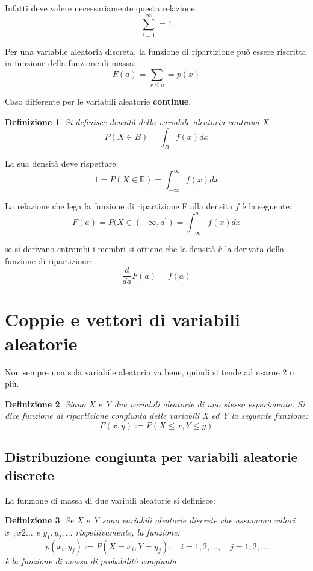 \documentclass[12pt]{article}
\newtheorem{definition}{Definizione}[section]
\begin{document}
Infatti deve valere necessariamente questa relazione: 
\[
\sum_{i=1}^{\infty} = 1    
\]
\newpage

Per una variabile aleatoria discreta, la funzione di ripartizione può essere riscritta
in funzione della funzione di massa: 
\[
F(a) = \sum_{x \le a} = p(x)    
\]

Caso differente per le variabili aleatorie {\bf{continue}}. 
\begin{definition}
    Si definisce densità della variabile aleatoria continua X
    \[
    P(X \in B) = \int_{B} f(x)dx    
    \]
\end{definition}

La sua densità deve rispettare: 
\[
    1 = P(X \in \mathbb{R} ) = \int_{-\infty}^{\infty} f(x)dx
\]

La relazione che lega la funzione di ripartizione F alla densita \(f\) è la seguente: 
\[
F(a) = P(X \in (-\infty,a]) = \int_{-\infty}^af(x)dx    
\]

se si derivano entrambi i membri si ottiene che la densità è la derivata
della funzione di ripartizione: 
\[
\frac{d}{da}F(a) = f(a)    
\]

\section{Coppie e vettori di variabili aleatorie}
Non sempre una sola variabile aleatoria va bene, quindi si tende ad 
usarne 2 o più.

\begin{definition}
    Siano X e Y due variabili aleatorie di uno stesso esperimento.
    Si dice funzione di ripartizione congiunta delle variabili X ed Y la seguente funzione:
    \[
    F(x,y) := P(X \le x, Y \le y)   
    \]
\end{definition}

\subsection{Distribuzione congiunta per variabili aleatorie discrete}

La funzione di massa di due varibili aleatorie si definisce: 
\begin{definition}
    Se X e Y sono variabili aleatorie discrete che assumono valori 
    \(x_1,x2\dots\) e \(y_1,y_2,\dots\) rispettivamente, la funzione:
    \[
    p(x_i,y_j) := P(X=x_i,Y=y_j), \quad i = 1,2,\dots, \quad j=1,2,\dots    
    \]    
    è la funzione di massa di probabilità congiunta
    
\end{definition}
\end{document}
